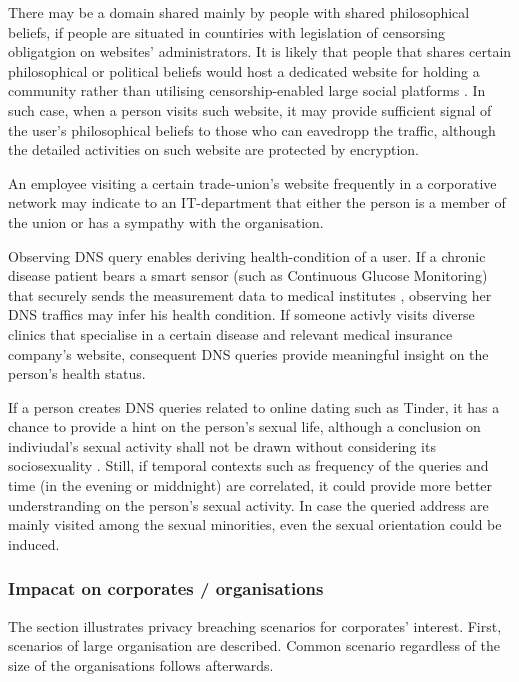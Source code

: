 There may be a domain shared mainly by people with shared philosophical beliefs, if people are situated in countiries with legislation of censorsing obligatgion on websites' administrators.
It is likely that people that shares certain philosophical or political beliefs would host a dedicated website for holding a community rather than utilising censorship-enabled large social platforms \cite{mackinnon2009china}.
In such case, when a person visits such website, it may provide sufficient signal of the user's philosophical beliefs to those who can eavedropp the traffic, although the detailed activities on such website are protected by encryption.

An employee visiting a certain trade-union's website frequently in a corporative network may indicate to an IT-department that either the person is a member of the union or has a sympathy with the organisation. 

Observing DNS query enables deriving health-condition of a user. If a chronic disease patient bears a smart sensor (such as Continuous Glucose Monitoring) that securely sends the measurement data to medical institutes \cite{carelink-uploading, medtronic-watson}, observing her DNS traffics may infer his health condition.
If someone activly visits diverse clinics that specialise in a certain disease and relevant medical insurance company's website, consequent DNS queries provide meaningful insight on the person's health status.

If a person creates DNS queries related to online dating such as Tinder, it has a chance to provide a hint on the person's sexual life, although a conclusion on indiviudal's sexual activity shall not be drawn without considering its sociosexuality \cite{sevi2018exploring}. Still, if temporal contexts such as frequency of the queries and time (in the evening or middnight) are correlated, it could provide more better understranding on the person's sexual activity.
In case the queried address are mainly visited among the sexual minorities, even the sexual orientation could be induced.

\subsubsection{Impacat on corporates / organisations}
The section illustrates privacy breaching scenarios for corporates' interest. First, scenarios of large organisation are described. Common scenario regardless of the size of the organisations follows afterwards.

